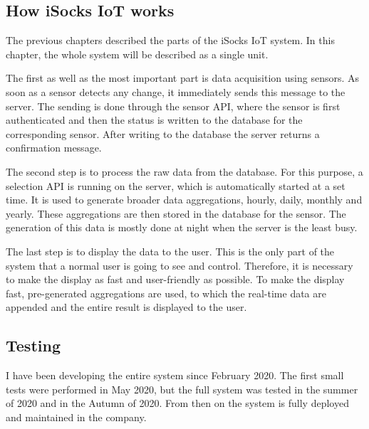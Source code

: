 \documentclass[12pt, a4paper]{article}
\begin{document}
\subsection*{How iSocks IoT works}

The previous chapters described the parts of the iSocks IoT system.
In this chapter, the whole system will be described as a single unit.

The first as well as the most important part is data acquisition using sensors.
As soon as a sensor detects any change, it immediately sends this message to the server.
The sending is done through the sensor API, where the sensor is first authenticated and then the status is written to the database for the corresponding sensor.
After writing to the database the server returns a confirmation message.

The second step is to process the raw data from the database.
For this purpose, a selection API is running on the server, which is automatically started at a set time.
It is used to generate broader data aggregations, hourly, daily, monthly and yearly.
These aggregations are then stored in the database for the sensor.
The generation of this data is mostly done at night when the server is the least busy.

The last step is to display the data to the user.
This is the only part of the system that a normal user is going to see and control.
Therefore, it is necessary to make the display as fast and user-friendly as possible.
To make the display fast, pre-generated aggregations are used, to which the real-time data are appended and the entire result is displayed to the user.



\subsection*{Testing}

I have been developing the entire system since February 2020.
The first small tests were performed in May 2020, but the full system was tested in the summer of 2020 and in the Autumn of 2020.
From then on the system is fully deployed  and maintained in the company.
\end{document}
